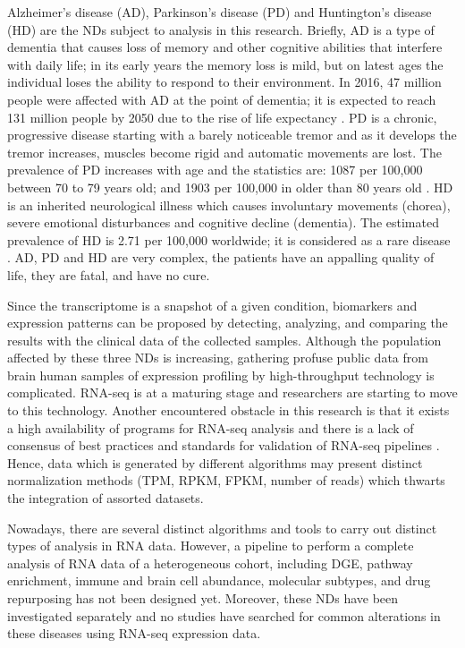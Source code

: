 Alzheimer's disease (AD), Parkinson’s disease (PD) and Huntington’s disease (HD) are the NDs subject to analysis in this research. Brieﬂy, AD is a type of dementia that causes loss of memory and other cognitive abilities that interfere with daily life; in its early years the memory loss is mild, but on latest ages the individual loses the ability to respond to their environment. In 2016, 47 million people were affected with AD at the point of dementia; it is expected to reach 131 million people by 2050 due to the rise of life expectancy \cite{WAR}. PD is a chronic, progressive disease starting with a barely noticeable tremor and as it develops the tremor increases, muscles become rigid and automatic movements are lost. The prevalence of PD increases with age and the statistics are: 1087 per 100,000 between 70 to 79 years old; and 1903 per 100,000 in older than 80 years old \cite{Tamara2014}. HD is an inherited neurological illness which causes involuntary movements (chorea), severe emotional disturbances and cognitive decline (dementia). The estimated prevalence of HD is 2.71 per 100,000 worldwide; it is considered as a rare disease \cite{PringsheimHD}. AD, PD and HD are very complex, the patients have an appalling quality of life, they are fatal, and have no cure.

Since the transcriptome is a snapshot of a given condition, biomarkers and expression patterns can be proposed by detecting, analyzing, and comparing the results with the clinical data of the collected samples. Although the population affected by these three NDs is increasing, gathering profuse public data from brain human samples of expression proﬁling by high-throughput technology is complicated. RNA-seq is at a maturing stage and researchers are starting to move to this technology. Another encountered obstacle in this research is that it exists a high availability of programs for RNA-seq analysis and there is a lack of consensus of best practices and standards for validation of RNA-seq pipelines \cite{Byron}. Hence, data which is generated by different algorithms may present distinct normalization methods (TPM, RPKM, FPKM, number of reads) which thwarts the integration of assorted datasets.

Nowadays, there are several distinct algorithms and tools to carry out distinct types of analysis in RNA data. However, a pipeline to perform a complete analysis of RNA data of a heterogeneous cohort, including DGE, pathway enrichment, immune and brain cell abundance, molecular subtypes, and drug repurposing has not been designed yet. Moreover, these NDs have been investigated separately and no studies have searched for common alterations in these diseases using RNA-seq expression data.


